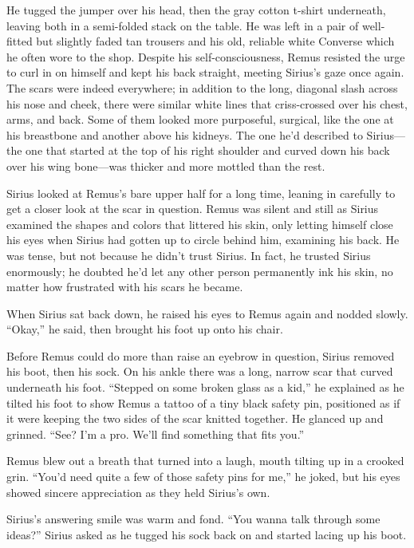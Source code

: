 He tugged the jumper over his head, then the gray cotton t-shirt underneath, leaving both in a semi-folded stack on the table. He was left in a pair of well-fitted but slightly faded tan trousers and his old, reliable white Converse which he often wore to the shop. Despite his self-consciousness, Remus resisted the urge to curl in on himself and kept his back straight, meeting Sirius’s gaze once again. The scars were indeed everywhere; in addition to the long, diagonal slash across his nose and cheek, there were similar white lines that criss-crossed over his chest, arms, and back. Some of them looked more purposeful, surgical, like the one at his breastbone and another above his kidneys. The one he’d described to Sirius—the one that started at the top of his right shoulder and curved down his back over his wing bone—was thicker and more mottled than the rest.

Sirius looked at Remus’s bare upper half for a long time, leaning in carefully to get a closer look at the scar in question. Remus was silent and still as Sirius examined the shapes and colors that littered his skin, only letting himself close his eyes when Sirius had gotten up to circle behind him, examining his back. He was tense, but not because he didn’t trust Sirius. In fact, he trusted Sirius enormously; he doubted he’d let any other person permanently ink his skin, no matter how frustrated with his scars he became.

When Sirius sat back down, he raised his eyes to Remus again and nodded slowly. “Okay,” he said, then brought his foot up onto his chair.

Before Remus could do more than raise an eyebrow in question, Sirius removed his boot, then his sock. On his ankle there was a long, narrow scar that curved underneath his foot. “Stepped on some broken glass as a kid,” he explained as he tilted his foot to show Remus a tattoo of a tiny black safety pin, positioned as if it were keeping the two sides of the scar knitted together. He glanced up and grinned. “See? I’m a pro. We’ll find something that fits you.”

Remus blew out a breath that turned into a laugh, mouth tilting up in a crooked grin. “You’d need quite a few of those safety pins for me,” he joked, but his eyes showed sincere appreciation as they held Sirius’s own.

Sirius's answering smile was warm and fond. “You wanna talk through some ideas?” Sirius asked as he tugged his sock back on and started lacing up his boot.

